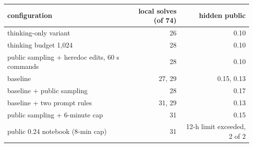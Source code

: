 \begin{tabular}{lrr}
\toprule
configuration & local solves (of 74) & hidden public \\
\midrule
thinking-only variant & 26 & 0.10 \\
thinking budget 1,024 & 28 & 0.10 \\
public sampling + heredoc edits, 60 s commands & 28 & 0.10 \\
baseline & 27, 29 & 0.15, 0.13 \\
baseline + public sampling & 28 & 0.17 \\
baseline + two prompt rules & 31, 29 & 0.13 \\
public sampling + 6-minute cap & 31 & 0.15 \\
public 0.24 notebook (8-min cap) & 31 & 12-h limit exceeded, 2 of 2 \\
\bottomrule
\end{tabular}
